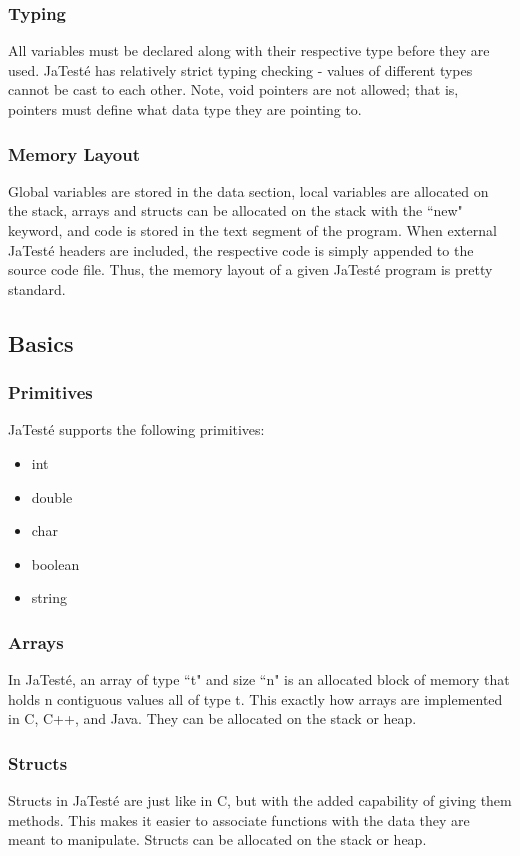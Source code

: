 \documentclass{article}
\begin{document}
\subsubsection{Typing}
All variables must be declared along with their respective type before they are used. JaTest\'{e} has relatively strict typing checking - values of different types cannot be cast to each other. Note, void pointers are not allowed; that is, pointers must define what data type they are pointing to.
\subsubsection{Memory Layout}
Global variables are stored in the data section, local variables are allocated on the stack, arrays and structs can be allocated on the stack with the ``new" keyword, and code is stored in the text segment of the program. When external JaTest\'{e} headers are included, the respective code is simply appended to the source code file. Thus, the memory layout of a given JaTest\'{e} program is pretty standard. 

\subsection{Basics}
\subsubsection{Primitives}
JaTest\'{e} supports the following primitives:
\begin{itemize}
\item int
\item double
\item char
\item boolean
\item string
\end{itemize}
\subsubsection{Arrays}
In JaTest\'{e}, an array of type ``t" and size ``n" is an allocated block of memory that holds n contiguous values all of type t. This exactly how arrays are implemented in C, C++, and Java. They can be allocated on the stack or heap.
\subsubsection{Structs}
Structs in JaTest\'{e} are just like in C, but with the added capability of giving them methods. This makes it easier to associate functions with the data they are meant to manipulate. Structs can be allocated on the stack or heap. 
\end{document}
